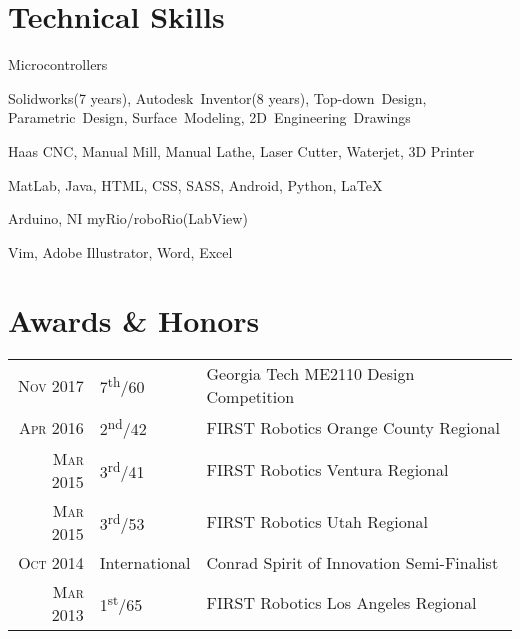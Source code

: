 \documentclass{resume}
\begin{document}
\section{Technical Skills}
\begin{skills}{Microcontrollers}
  \item [CAD] Solidworks(7 years), Autodesk~Inventor(8 years), Top-down~Design, Parametric~Design, Surface~Modeling, 2D~Engineering~Drawings
  \item [Manufacturing] Haas CNC, Manual Mill, Manual Lathe, Laser Cutter, Waterjet, 3D Printer
  \item [Programming] MatLab, Java, HTML, CSS, SASS, Android, Python, \LaTeX
  \item [Microcontrollers] Arduino, NI myRio/roboRio(LabView)
  \item [Software] Vim, Adobe Illustrator, Word, Excel
\end{skills}

\section{Awards \& Honors}
\begin{tabular}{rll}
  \textsc{Nov} 2017 & 7\textsuperscript{th}/60 & Georgia Tech ME2110 Design Competition\\
  \textsc{Apr} 2016 & 2\textsuperscript{nd}/42 & FIRST Robotics Orange County Regional\\
  \textsc{Mar} 2015 & 3\textsuperscript{rd}/41 & FIRST Robotics Ventura Regional\\
  \textsc{Mar} 2015 & 3\textsuperscript{rd}/53 & FIRST Robotics Utah Regional\\
  \textsc{Oct} 2014 & International & Conrad Spirit of Innovation Semi-Finalist\\
  \textsc{Mar} 2013 & 1\textsuperscript{st}/65 & FIRST Robotics Los Angeles Regional\\
\end{tabular}
\end{document}
